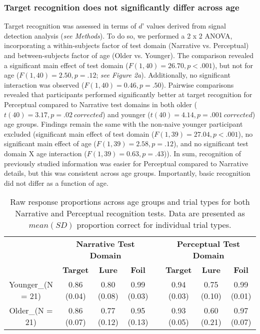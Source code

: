 \documentclass[11pt]{article}
\begin{document}
\subsubsection*{Target recognition does not significantly differ across age}
Target recognition was assessed in terms of $d’$ values derived from signal detection analysis (\textit{see Methods}). To do so, we performed a 2 x 2 ANOVA, incorporating a within-subjects factor of test domain (Narrative vs. Perceptual) and between-subjects factor of age (Older vs. Younger). The comparison revealed a significant main effect of test domain ($F(1, 40) = 26.70, p < .001$), but not for age ($F(1, 40) = 2.50, p = .12$; \textit{see Figure 2a}). Additionally, no significant interaction was observed ($F(1, 40) = 0.46, p = .50$). Pairwise comparisons revealed that participants performed significantly better at target recognition for Perceptual compared to Narrative test domains in both older ($t(40) = 3.17, p=.02\ corrected$) and younger ($t(40) = 4.14, p=.001 \ corrected$) age groups. Findings remain the same with the non-naive younger participant excluded (significant main effect of test domain ($F(1, 39) = 27.04, p < .001$), no significant main effect of age ($F(1, 39) = 2.58, p = .12$), and no significant test domain X age interaction ($F(1, 39) = 0.63, p = .43$)). In sum, recognition of previously studied information was easier for Perceptual compared to Narrative details, but this was consistent across age groups. Importantly, basic recognition did not differ as a function of age.

\begin{table}[]
\begin{tabular}{cccccccc}
 & \multicolumn{3}{c}{\textbf{Narrative Test Domain}} & \textbf{} & \multicolumn{3}{c}{\textbf{Perceptual Test Domain}} \\ \cline{2-4} \cline{6-8} 
 & \textbf{Target}  & \textbf{Lure}  & \textbf{Foil}  & \textbf{} & \textbf{Target}   & \textbf{Lure}  & \textbf{Foil}  \\ \cline{2-4} \cline{6-8} 
Younger_{(N = 21)} & 0.86 (0.04) & 0.80 (0.08) & 0.99 (0.03) &  & 0.94 (0.03) & 0.75 (0.10) & 0.99 (0.01) \\
Older_{(N = 21)}  & 0.86 (0.07) & 0.77 (0.12) & 0.95 (0.13) &  & 0.93 (0.05) & 0.60 (0.21) & 0.97 (0.07)
\end{tabular}
\caption{Raw response proportions across age groups and trial types for both Narrative and Perceptual recognition tests. Data are presented as $mean (SD)$ proportion correct for individual trial types.}
\label{table1}
\end{table}
\end{document}
